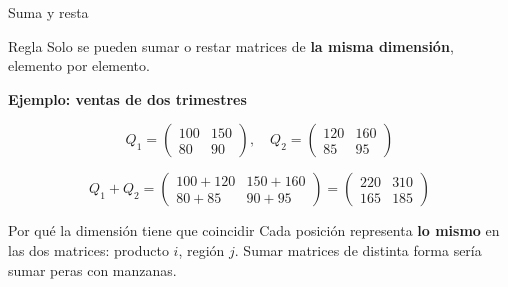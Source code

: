\documentclass[aspectratio=169,10pt]{beamer}
\begin{document}
\begin{frame}{Suma y resta}

\begin{block}{Regla}
Solo se pueden sumar o restar matrices de \textbf{la misma dimensión}, elemento por elemento.
\end{block}

\vspace{0.3cm}
\textbf{Ejemplo: ventas de dos trimestres}

$$Q_1 = \begin{pmatrix} 100 & 150 \\ 80 & 90 \end{pmatrix}, \quad
Q_2 = \begin{pmatrix} 120 & 160 \\ 85 & 95 \end{pmatrix}$$

$$Q_1 + Q_2 = \begin{pmatrix} 100+120 & 150+160 \\ 80+85 & 90+95 \end{pmatrix}
= \begin{pmatrix} 220 & 310 \\ 165 & 185 \end{pmatrix}$$

\vspace{0.3cm}
\begin{alertblock}{Por qué la dimensión tiene que coincidir}
Cada posición representa \textbf{lo mismo} en las dos matrices: producto $i$, región $j$.
Sumar matrices de distinta forma sería sumar peras con manzanas.
\end{alertblock}
\end{frame}
\end{document}

